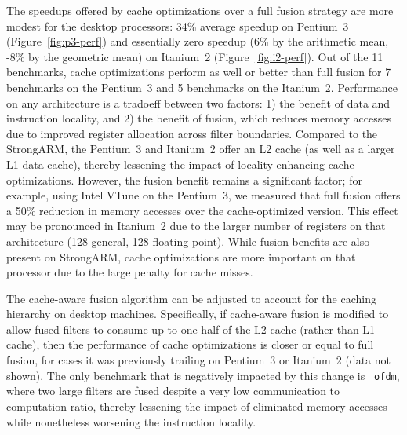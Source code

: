 The speedups offered by cache optimizations over a full fusion
strategy are more modest for the desktop processors: 34\% average
speedup on Pentium~3 (Figure~\ref{fig:p3-perf}) and essentially zero
speedup (6\% by the arithmetic mean, -8\% by the geometric mean) on
Itanium~2 (Figure~\ref{fig:i2-perf}).  Out of the 11 benchmarks, cache
optimizations perform as well or better than full fusion for 7
benchmarks on the Pentium~3 and 5 benchmarks on the Itanium~2.
Performance on any architecture is a tradoeff between two factors: 1)
the benefit of data and instruction locality, and 2) the benefit of
fusion, which reduces memory accesses due to improved register
allocation across filter boundaries.  Compared to the StrongARM, the
Pentium~3 and Itanium~2 offer an L2 cache (as well as a larger L1 data
cache), thereby lessening the impact of locality-enhancing cache
optimizations.  However, the fusion benefit remains a significant
factor; for example, using Intel VTune on the Pentium~3, we measured
that full fusion offers a 50\% reduction in memory accesses over the
cache-optimized version.  This effect may be pronounced in Itanium~2
due to the larger number of registers on that architecture (128
general, 128 floating point).  While fusion benefits are also present
on StrongARM, cache optimizations are more important on that processor
due to the large penalty for cache misses.

The cache-aware fusion algorithm can be adjusted to account for the
caching hierarchy on desktop machines.  Specifically, if cache-aware
fusion is modified to allow fused filters to consume up to one half of
the L2 cache (rather than L1 cache), then the performance of cache
optimizations is closer or equal to full fusion, for cases it was
previously trailing on Pentium~3 or Itanium~2 (data not shown).  The
only benchmark that is negatively impacted by this change is {\tt
ofdm}, where two large filters are fused despite a very low
communication to computation ratio, thereby lessening the impact of
eliminated memory accesses while nonetheless worsening the instruction
locality.

